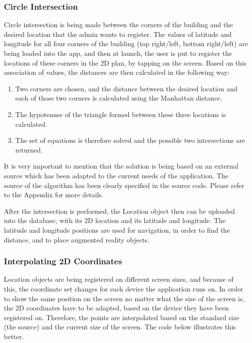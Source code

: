 \subsubsection*{Circle Intersection}
Circle intersection is being made between the corners of the building and the desired location that the admin wants to register. The values of latitude and longitude for all four corners of the building (top right/left, bottom right/left) are being loaded into the app, and then at launch, the user is put to register the locations of these corners in the 2D plan, by tapping on the screen. Based on this association of values, the distances are then calculated in the following way:
\begin{enumerate}
    \item Two corners are chosen, and the distance between the desired location and each of those two corners is calculated using the Manhattan distance.
    \item The hypotenuse of the triangle formed between these three locations is calculated.
    \item The set of equations is therefore solved and the possible two intersections are returned.
\end{enumerate}

It is very important to mention that the solution is being based on an external source which has been adapted to the current needs of the application. The source of the algorithm has been clearly specified in the source code. Please refer to the Appendix for more details.

After the intersection is performed, the Location object then can be uploaded into the database, with its 2D location and its latitude and longitude. The latitude and longitude positions are used for navigation, in order to find the distance, and to place augmented reality objects.

\subsubsection*{Interpolating 2D Coordinates}
Location objects are being registered on different screen sizes, and because of this, the coordinate set changes for each device the application runs on. In order to show the same position on the screen no matter what the size of the screen is, the 2D coordinates have to be adapted, based on the device they have been registered on. Therefore, the points are interpolated based on the standard size (the source) and the current size of the screen. The code below illustrates this better.

